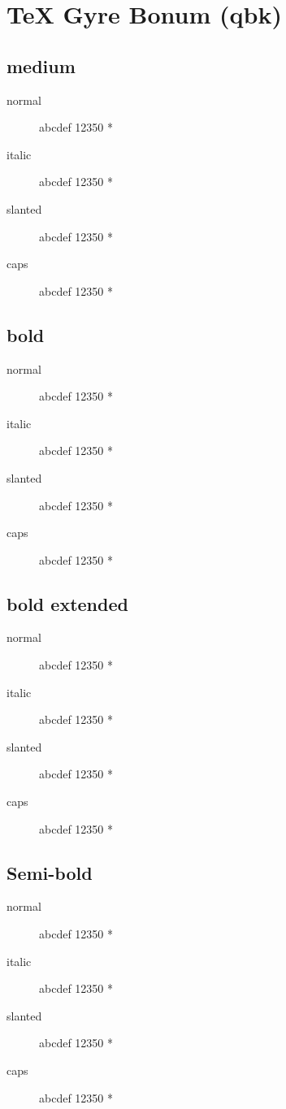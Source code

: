 \section{\TeX{} Gyre Bonum (qbk)}

\subsection{medium}
\begin{description}
    \item [normal]  abcdef 12350 *
    \item [italic]  abcdef 12350 *
    \item [slanted]  abcdef 12350 *
    \item [caps]  abcdef 12350 *
\end{description}
    
\subsection{bold}
\begin{description}
    \item [normal]  abcdef 12350 *
    \item [italic]  abcdef 12350 *
    \item [slanted]  abcdef 12350 *
    \item [caps]  abcdef 12350 *
\end{description}
    
\subsection{bold extended}
\begin{description}
    \item [normal]  abcdef 12350 *
    \item [italic]  abcdef 12350 *
    \item [slanted]  abcdef 12350 *
    \item [caps]  abcdef 12350 *
\end{description}

\subsection{Semi-bold}
\begin{description}
    \item [normal]  abcdef 12350 *
    \item [italic]  abcdef 12350 *
    \item [slanted]  abcdef 12350 *
    \item [caps]  abcdef 12350 *
\end{description}

